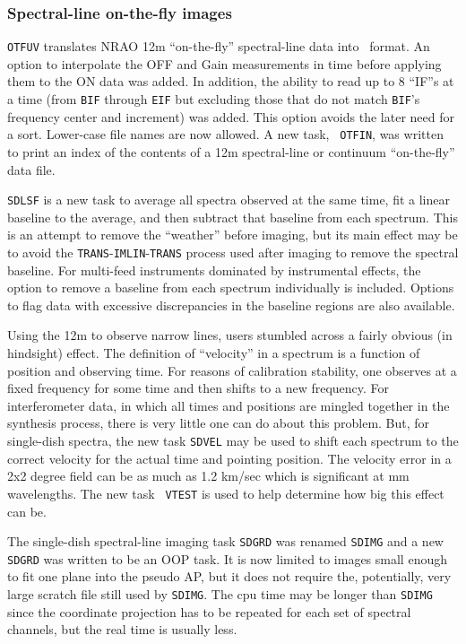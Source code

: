 \subsubsection{Spectral-line on-the-fly images}

{\tt OTFUV} translates NRAO 12m ``on-the-fly'' spectral-line data into
\AIPS\ format.  An option to interpolate the OFF and Gain measurements
in time before applying them to the ON data was added.  In addition,
the ability to read up to 8 ``IF''s at a time (from {\tt BIF} through
{\tt EIF} but excluding those that do not match {\tt BIF}'s frequency
center and increment) was added.  This option avoids the later need
for a sort.  Lower-case file names are now allowed.  A new task, {\tt
OTFIN}, was written to print an index of the contents of a 12m
spectral-line or continuum ``on-the-fly'' data file.

{\tt SDLSF} is a new task to average all spectra observed at the same
time, fit a linear baseline to the average, and then subtract that
baseline from each spectrum.  This is an attempt to remove the
``weather'' before imaging, but its main effect may be to avoid the
{\tt TRANS}-{\tt IMLIN}-{\tt TRANS} process used after imaging to
remove the spectral baseline.  For multi-feed instruments dominated by
instrumental effects, the option to remove a baseline from each
spectrum individually is included.  Options to flag data with excessive
discrepancies in the baseline regions are also available.

Using the 12m to observe narrow lines, users stumbled across a fairly
obvious (in hindsight) effect.  The definition of ``velocity'' in a
spectrum is a function of position and observing time.  For reasons of
calibration stability, one observes at a fixed frequency for some time
and then shifts to a new frequency.  For interferometer data, in which
all times and positions are mingled together in the synthesis process,
there is very little one can do about this problem.  But, for
single-dish spectra, the new task {\tt SDVEL} may be used to shift
each spectrum to the correct velocity for the actual time and pointing
position.  The velocity error in a 2x2 degree field can be as much as
1.2 km/sec which is significant at mm wavelengths.  The new task {\tt
VTEST} is used to help determine how big this effect can be.

\vfill\eject
The single-dish spectral-line imaging task {\tt SDGRD} was renamed
{\tt SDIMG} and a new {\tt SDGRD} was written to be an OOP task.  It
is now limited to images small enough to fit one plane into the pseudo
AP, but it does not require the, potentially, very large scratch file
still used by \hbox{{\tt SDIMG}}.  The cpu time may be longer than
{\tt SDIMG} since the coordinate projection has to be repeated for
each set of spectral channels, but the real time is usually less.

